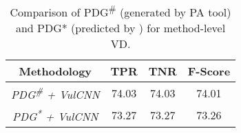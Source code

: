 
%


\begin{table}[t]
  \centering
  \small
  \caption{Comparison of PDG\textsuperscript{\#} (generated by PA tool) and PDG* (predicted by \tool) for  method-level VD.}
\begin{tabular}{c|c|c|c}
\hline
\textbf{Methodology}                       & \textbf{TPR}       & \textbf{TNR} & \textbf{F-Score} \\ \hline
\textit{PDG\textsuperscript{\#} + VulCNN}  &  74.03             &  74.03       & 74.01                  \\
\textit{PDG\textsuperscript{*} + VulCNN}   &  73.27             &  73.27       & 73.26\\
\hline
\end{tabular}
\label{tab:extr-method}
\end{table}
